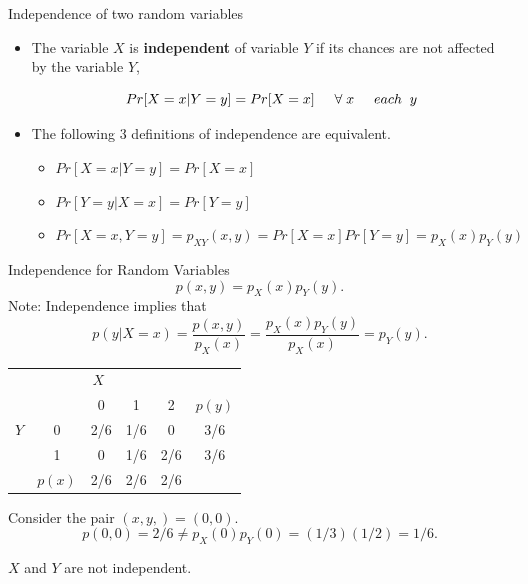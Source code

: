 \documentclass{beamer}\usepackage[]{graphicx}\usepackage[]{color}
\begin{document}
\begin{frame}{Independence of two random variables}

\begin{itemize}
\item The variable  $X$ is {\bf independent} of variable $Y$ if its
chances are not affected by the variable $Y$,

$$ Pr[X=x | Y=y] = Pr[X=x]  \hspace{0.5 cm} \forall \; x \hspace{0.5 cm} each \;\; y$$

\item The following 3 definitions of independence are equivalent.
\begin{itemize}\normalsize
\item $Pr[X=x | Y=y] = Pr[X=x]$
\item $Pr[Y=y | X=x] = Pr[Y=y]$
\item $Pr[X=x, Y=y] = p_{XY}(x,y) = Pr[X=x]Pr[Y=y] = p_{X}(x)p_{Y}(y)$
\end{itemize}

\end{itemize}

\end{frame}

\begin{frame}{Independence for Random Variables}
$$p(x,y) = p_X(x)p_Y(y).$$
Note: Independence implies that
$$p(y|X=x) = \frac{p(x,y)}{p_X(x)} = \frac{p_X(x)p_Y(y)}{p_X(x)} = p_Y(y).$$
\begin{center}
\begin{tabular}{l|c||c|c|c||c|}
\multicolumn{5}{c}{$X$}\\
\cline{2-6}
&&0&1&2&$p(y)$\\
\cline{2-6}
$Y$&0&2/6& 1/6&0&3/6\\
\cline{2-6}
   &1&0&1/6&2/6&3/6\\
\cline{2-6}
   &$p(x)$ &2/6&2/6&2/6&\\
\cline{2-6}
\end{tabular}
\end{center}

Consider the pair $(x,y,) = (0,0).$
$$p(0,0) = 2/6 \ne p_X(0)p_Y(0) = (1/3)(1/2) = 1/6.$$

$X$ and $Y$ are not independent.

\end{frame}
\end{document}

